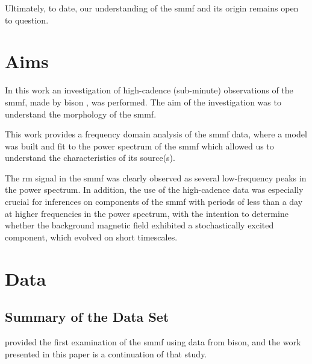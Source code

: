 Ultimately, to date, our understanding of the \gls{smmf} and its origin remains open to question.


\section{Aims}\label{sec:SMMF_aims}

In this work an investigation of high-cadence (sub-minute) observations of the \gls{smmf}, made by \gls{bison} \citep{chaplin_bison_1996, chaplin_noise_2005, hale_performance_2016}, was performed. The aim of the investigation was to understand the morphology of the \gls{smmf}. 

This work provides a frequency domain analysis of the \gls{smmf} data, where a model was built and fit to the power spectrum of the \gls{smmf} which allowed us to understand the characteristics of its source(s). 

The \gls{rm} signal in the \gls{smmf} was clearly observed as several low-frequency peaks in the power spectrum. In addition, the use of the high-cadence data was especially crucial for inferences on components of the \gls{smmf} with periods of less than a day at higher frequencies in the power spectrum, with the intention to determine whether the background magnetic field exhibited a stochastically excited component, which evolved on short timescales.




\section{Data}\label{sec:SMMF_data}


\subsection{Summary of the Data Set}

\citet{chaplin_studies_2003} provided the first examination of the \gls{smmf} using data from \gls{bison}, and the work presented in this paper is a continuation of that study.

